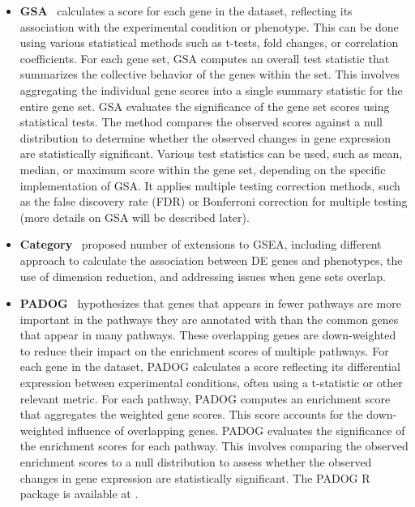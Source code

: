 \documentclass[Minh_PhD_thesis.tex]{subfiles}
\begin{document}
\begin{itemize}
\item \textbf{GSA}~\cite{Efron:2007} calculates a score for each gene in the dataset, reflecting its association with the experimental condition or phenotype. This can be done using various statistical methods such as t-tests, fold changes, or correlation coefficients. For each gene set, GSA computes an overall test statistic that summarizes the collective behavior of the genes within the set. This involves aggregating the individual gene scores into a single summary statistic for the entire gene set. GSA evaluates the significance of the gene set scores using statistical tests. The method compares the observed scores against a null distribution to determine whether the observed changes in gene expression are statistically significant. Various test statistics can be used, such as mean, median, or maximum score within the gene set, depending on the specific implementation of GSA. It applies multiple testing correction methods, such as the false discovery rate (FDR) or Bonferroni correction for multiple testing (more details on GSA will be described later).

\item \textbf{Category}~\cite{jiang2007extensions} proposed number of extensions to GSEA, including different approach to calculate the association between DE genes and phenotypes, the use of dimension reduction, and addressing issues when gene sets overlap. 

\item \textbf{PADOG}~\cite{Tarca2012down} hypothesizes that genes that appears in fewer pathways are more important in the pathways they are annotated with than the common genes that appear in many pathways.  These overlapping genes are down-weighted to reduce their impact on the enrichment scores of multiple pathways. For each gene in the dataset, PADOG calculates a score reflecting its differential expression between experimental conditions, often using a t-statistic or other relevant metric. For each pathway, PADOG computes an enrichment score that aggregates the weighted gene scores. This score accounts for the down-weighted influence of overlapping genes. PADOG evaluates the significance of the enrichment scores for each pathway. This involves comparing the observed enrichment scores to a null distribution to assess whether the observed changes in gene expression are statistically significant. The PADOG R package is available at \cite{TarcaPADOG}.


\end{itemize}
\end{document}
